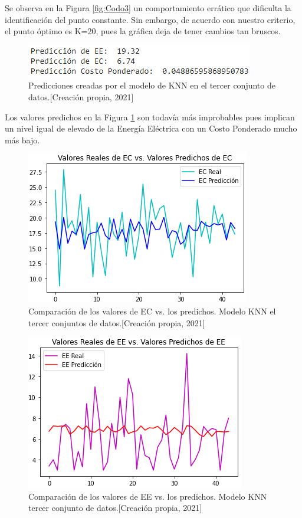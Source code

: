 \documentclass{article}
\begin{document}
Se observa en la Figura \ref{fig:Codo3} un comportamiento errático que dificulta la identificación del punto constante. Sin embargo, de acuerdo con nuestro criterio, el punto óptimo es K=20, pues la gráfica deja de tener cambios tan bruscos. 

\begin{figure}[!h]
    \centering
    \includegraphics[scale=.7]{F4/F4-im24.PNG}
    \caption{Predicciones creadas por el modelo de KNN en el tercer conjunto de datos.[Creación propia, 2021]}
    \label{fig:Prediccion3.1}
\end{figure}

Los valores predichos en la Figura \ref{fig:Prediccion3.1} son todavía más improbables pues implican un nivel igual de elevado de la Energía Eléctrica con un Costo Ponderado mucho más bajo. \pagebreak

\begin{figure}[!h]
    \centering
    \includegraphics[scale=.7]{F4/F4-im25.PNG}
    \caption{Comparación de los valores de EC vs. los predichos. Modelo  KNN el tercer conjuntos de datos.[Creación propia, 2021]}
    \label{fig:EC3.1}
\end{figure}

\begin{figure}[!h]
    \centering
    \includegraphics[scale=.7]{F4/F4-im26.PNG}
    \caption{Comparación de los valores de EE vs. los predichos. Modelo KNN tercer conjunto de datos.[Creación propia, 2021]}
    \label{fig:EE3.1}
\end{figure}
\end{document}
